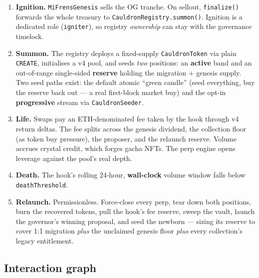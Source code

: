\documentclass[11pt,a4paper]{article}
\newcommand{\code}[1]{\texttt{\small #1}}
\begin{document}
\begin{enumerate}
\item \textbf{Ignition.} \code{MiFrensGenesis} sells the OG tranche. On sellout,
\code{finalize()} forwards the whole treasury to \code{CauldronRegistry.summon()}.
Ignition is a dedicated role (\code{igniter}), so registry \emph{ownership} can
stay with the governance timelock.

\item \textbf{Summon.} The registry deploys a fixed-supply \code{CauldronToken}
via plain \code{CREATE}, initialises a v4 pool, and seeds \emph{two} positions:
an \textbf{active} band and an out-of-range single-sided \textbf{reserve} holding
the migration + genesis supply. Two seed paths exist: the default atomic
``green candle'' (seed everything, buy the reserve back out --- a real first-block
market buy) and the opt-in \textbf{progressive} stream via \code{CauldronSeeder}.

\item \textbf{Life.} Swaps pay an ETH-denominated fee taken by the hook through
v4 return deltas. The fee splits across the genesis dividend, the collection
floor (as token buy pressure), the proposer, and the relaunch reserve. Volume
accrues crystal credit, which forges gacha NFTs. The perp engine opens leverage
against the pool's real depth.

\item \textbf{Death.} The hook's rolling 24-hour, \textbf{wall-clock} volume
window falls below \code{deathThreshold}.

\item \textbf{Relaunch.} Permissionless. Force-close every perp, tear down both
positions, burn the recovered tokens, pull the hook's fee reserve, sweep the
vault, launch the governor's winning proposal, and seed the newborn --- sizing
its reserve to cover 1:1 migration \emph{plus} the unclaimed genesis floor
\emph{plus} every collection's legacy entitlement.
\end{enumerate}

\subsection{Interaction graph}
\end{document}

